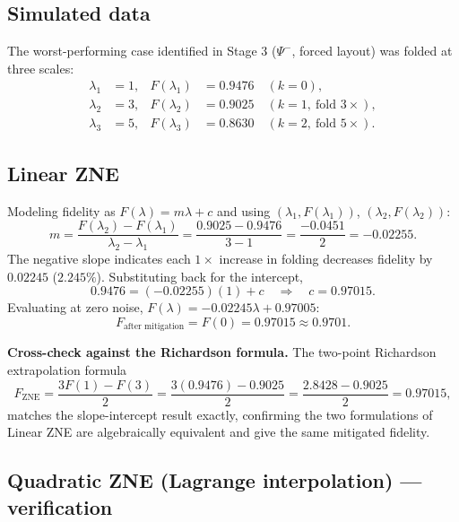 \documentclass[11pt]{article}
\begin{document}
\subsection{Simulated data}

The worst-performing case identified in Stage 3 ($\Psi^-$, forced layout) was folded at three scales:
\begin{align}
\lambda_1&=1, & F(\lambda_1)&=0.9476 \quad (k=0), \label{eq:zne-data1}\\
\lambda_2&=3, & F(\lambda_2)&=0.9025 \quad (k=1,\ \text{fold }3\times), \label{eq:zne-data2}\\
\lambda_3&=5, & F(\lambda_3)&=0.8630 \quad (k=2,\ \text{fold }5\times). \label{eq:zne-data3}
\end{align}

\subsection{Linear ZNE}

Modeling fidelity as $F(\lambda)=m\lambda+c$ and using $(\lambda_1,F(\lambda_1))$, $(\lambda_2,F(\lambda_2))$:
\begin{equation}
m = \frac{F(\lambda_2)-F(\lambda_1)}{\lambda_2-\lambda_1} = \frac{0.9025-0.9476}{3-1} = \frac{-0.0451}{2} = -0.02255.
\label{eq:zne-slope}
\end{equation}
The negative slope indicates each $1\times$ increase in folding decreases fidelity by $0.02245$ ($2.245\%$). Substituting back for the intercept,
\begin{equation}
0.9476 = (-0.02255)(1) + c \quad\Rightarrow\quad c = 0.97015.
\label{eq:zne-intercept}
\end{equation}
Evaluating at zero noise, $F(\lambda)=-0.02245\lambda+0.97005$:
\begin{equation}
F_{\text{after mitigation}} = F(0) = 0.97015 \approx \boxed{0.9701}.
\label{eq:zne-result}
\end{equation}

\textbf{Cross-check against the Richardson formula.} The two-point Richardson extrapolation formula
\begin{equation}
F_{\text{ZNE}} = \frac{3F(1)-F(3)}{2} = \frac{3(0.9476)-0.9025}{2} = \frac{2.8428-0.9025}{2} = 0.97015,
\label{eq:richardson}
\end{equation}
matches the slope-intercept result exactly, confirming the two formulations of Linear ZNE are algebraically equivalent and give the same mitigated fidelity.

\subsection{Quadratic ZNE (Lagrange interpolation) --- verification}
\end{document}
